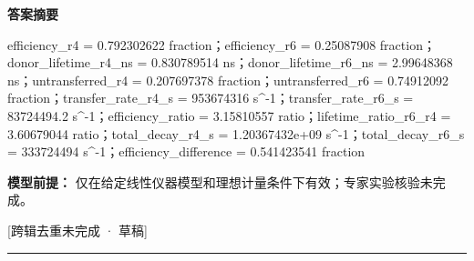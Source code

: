 \documentclass[UTF8,11pt,a4paper]{ctexart}
\begin{document}
\noindent\textbf{答案摘要}\par
efficiency\_r4 = 0.792302622 fraction；efficiency\_r6 = 0.25087908 fraction；donor\_lifetime\_r4\_ns = 0.830789514 ns；donor\_lifetime\_r6\_ns = 2.99648368 ns；untransferred\_r4 = 0.207697378 fraction；untransferred\_r6 = 0.74912092 fraction；transfer\_rate\_r4\_s = 953674316 s\textasciicircum{}-1；transfer\_rate\_r6\_s = 83724494.2 s\textasciicircum{}-1；efficiency\_ratio = 3.15810557 ratio；lifetime\_ratio\_r6\_r4 = 3.60679044 ratio；total\_decay\_r4\_s = 1.20367432e+09 s\textasciicircum{}-1；total\_decay\_r6\_s = 333724494 s\textasciicircum{}-1；efficiency\_difference = 0.541423541 fraction\par
\noindent\textbf{模型前提：}
仅在给定线性仪器模型和理想计量条件下有效；专家实验核验未完成。\par
\noindent\textcolor{red!65!black}{[跨辑去重未完成 · 草稿]} \par
\medskip\hrule\medskip
{}
\end{document}
